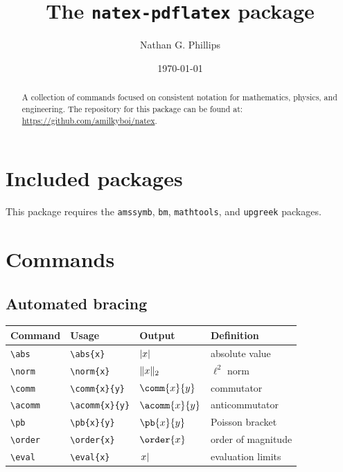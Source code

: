 \documentclass[11pt]{article}
\title{The \texttt{natex-pdflatex} package}
\author{Nathan G. Phillips}
\date{\today}
\begin{document}
\maketitle

\begin{abstract}
    A collection of commands focused on consistent notation for mathematics, physics, and engineering. The repository for this package can be found at: \url{https://github.com/amilkyboi/natex}.
\end{abstract}

\tableofcontents

\newpage
\section{Included packages}

This package requires the \verb|amssymb|, \verb|bm|, \verb|mathtools|, and \verb|upgreek| packages.

\newpage
\section{Commands}

\subsection{Automated bracing}

\begin{tabular}{llll}
    Command       & Usage                 & Output           & Definition         \\
    \hline
    \verb|\abs|   & \verb|\abs{x}|        & $\lvert x\rvert$        & absolute value     \\
    \verb|\norm|  & \verb|\norm{x}|       & $\lVert x\rVert_{2}$       & $\ell^2$ norm      \\
    \verb|\comm|  & \verb|\comm{x}{y}|    & $\comm{x}{y}$    & commutator         \\
    \verb|\acomm| & \verb|\acomm{x}{y}|   & $\acomm{x}{y}$   & anticommutator     \\
    \verb|\pb|    & \verb|\pb{x}{y}|      & $\pb{x}{y}$      & Poisson bracket    \\
    \verb|\order| & \verb|\order{x}|      & $\order{x}$      & order of magnitude \\
    \verb|\eval|  & \verb|\eval{x}|       & $\left.x\right\rvert$       & evaluation limits  \\
\end{tabular}
\end{document}
